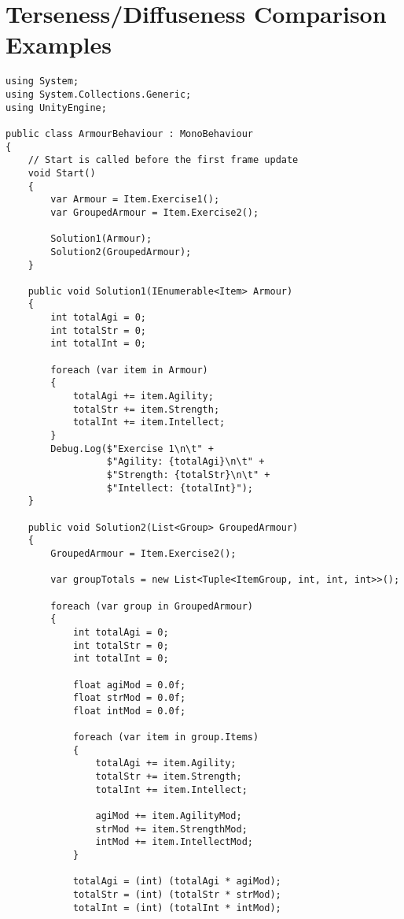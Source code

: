 \chapter{Terseness/Diffuseness Comparison Examples} \label{app:terse-diff-comp}

\begin{listing}[H]
\begin{verbatim}
using System;
using System.Collections.Generic;
using UnityEngine;

public class ArmourBehaviour : MonoBehaviour
{
    // Start is called before the first frame update
    void Start()
    {
        var Armour = Item.Exercise1();
        var GroupedArmour = Item.Exercise2();

        Solution1(Armour);
        Solution2(GroupedArmour);
    }

    public void Solution1(IEnumerable<Item> Armour)
    {
        int totalAgi = 0;
        int totalStr = 0;
        int totalInt = 0;

        foreach (var item in Armour)
        {
            totalAgi += item.Agility;
            totalStr += item.Strength;
            totalInt += item.Intellect;
        }
        Debug.Log($"Exercise 1\n\t" +
                  $"Agility: {totalAgi}\n\t" +
                  $"Strength: {totalStr}\n\t" +
                  $"Intellect: {totalInt}");
    }

    public void Solution2(List<Group> GroupedArmour)
    {
        GroupedArmour = Item.Exercise2();

        var groupTotals = new List<Tuple<ItemGroup, int, int, int>>();

        foreach (var group in GroupedArmour)
        {
            int totalAgi = 0;
            int totalStr = 0;
            int totalInt = 0;

            float agiMod = 0.0f;
            float strMod = 0.0f;
            float intMod = 0.0f;

            foreach (var item in group.Items)
            {
                totalAgi += item.Agility;
                totalStr += item.Strength;
                totalInt += item.Intellect;

                agiMod += item.AgilityMod;
                strMod += item.StrengthMod;
                intMod += item.IntellectMod;
            }

            totalAgi = (int) (totalAgi * agiMod);
            totalStr = (int) (totalStr * strMod);
            totalInt = (int) (totalInt * intMod);


\end{verbatim}
\end{listing}
